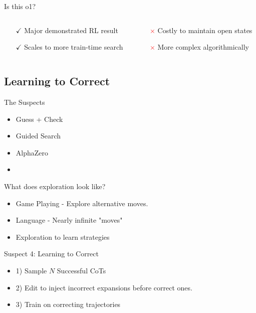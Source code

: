 \documentclass[14pt,aspectratio=169]{beamer}
\begin{document}
\begin{frame}{Is this o1?}
	\begin{columns}
		\begin{column}{0.5\linewidth}
			\begin{itemize}
				\item[$\boldsymbol{\checkmark}$] Major demonstrated RL result
				\item[$\boldsymbol{\checkmark}$] Scales to more train-time search
			\end{itemize}
		\end{column}
		\begin{column}{0.5\linewidth}
			\begin{itemize}
				\item[\textcolor{red}{$\boldsymbol{\times}$}] Costly to maintain open states
				\item[\textcolor{red}{$\boldsymbol{\times}$}] More complex algorithmically
			\end{itemize}
		\end{column}
	\end{columns}
\end{frame}

\subsection{Learning to Correct}

\begin{frame}{The Suspects}
	\begin{itemize}
		\item Guess + Check
		\item Guided Search
		\item AlphaZero
		\item {}
	\end{itemize}
\end{frame}

\begin{frame}{What does exploration look like?}
	\begin{itemize}
		\item Game Playing - Explore alternative moves.
		\item Language - Nearly infinite "moves"
		\item Exploration to learn strategies
	\end{itemize}

\end{frame}

\begin{frame}{Suspect 4: Learning to Correct}
	\begin{itemize}
		\item 1) Sample $N$ Successful CoTs
		\item 2) Edit to inject incorrect expansions before
		      correct ones.
		\item 3) Train on correcting trajectories
	\end{itemize}
\end{frame}
\end{document}
